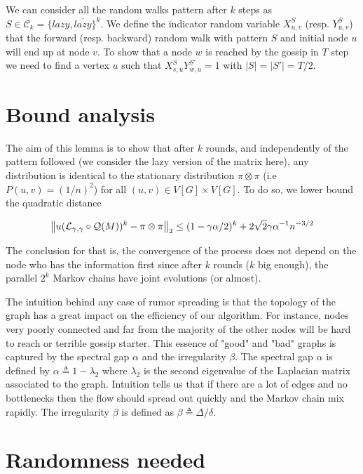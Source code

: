 \documentclass[10pt,journal,a4paper]{IEEEtran}
\begin{document}
We can consider all the random walks pattern after $k$ steps as $S \in \mathcal C_k = \{ lazy, \overline{lazy} \}^k$. We define the indicator random variable $X_{u,v}^S$ (resp. $Y_{u,v}^S$) that the forward (resp. backward) random walk with pattern $S$ and initial node $u$ will end up at node $v$. To show that a node $w$ is reached by the gossip in $T$ step we need to find a vertex $u$ such that $X_{s,u}^{S}Y_{w,u}^{S'} = 1$ with $|S| = |S'| = T/2$.

\section{Bound analysis}

The aim of this lemma is to show that after $k$ rounds, and independently of the pattern followed (we consider the lazy version of the matrix here), any distribution is identical to the stationary distribution $\pi \otimes \pi$ (i.e $P(u,v)=(1/n)^2$) for all $(u,v) \in V[G] \times V[G]$. To do so, we lower bound the quadratic distance

\[
  \left\lVert u(\mathcal L_{\gamma,\gamma} \circ \mathcal Q(M))^k - \pi \otimes \pi\right\rVert_2 \leq (1 - \gamma \alpha / 2)^k + 2 \sqrt 2 \gamma \alpha^{-1} n^{-3/2}
\]

The conclusion for that is, the convergence of the process does not depend on the node who has the information first since after $k$ rounds ($k$ big enough), the parallel $2^k$ Markov chains have joint evolutions (or almost).

The intuition behind any case of rumor spreading is that the topology of the graph has a great impact on the efficiency of our algorithm. For instance, nodes very poorly connected and far from the majority of the other nodes will be hard to reach or terrible gossip starter. This essence of "good" and "bad" graphs is captured by the spectral gap $\alpha$ and the irregularity $\beta$. The spectral gap $\alpha$ is defined by $\alpha \triangleq 1 - \lambda_2$ where $\lambda_2$ is the second eigenvalue of the Laplacian matrix associated to the graph. 
Intuition tells us that if there are a lot of edges and no bottlenecks then the flow should spread out quickly and the Markov chain mix rapidly. The irregularity $\beta$ is defined as $\beta \triangleq \Delta/\delta$.

\section{Randomness needed}


\end{document}

